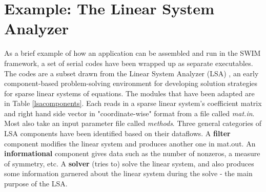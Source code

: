 \section{Example: The Linear System Analyzer}
\label{sec:lsa}

% 
% 
% 
% 
% 
% 
% 
% 

As a brief example of how an application can be assembled and run in the
SWIM framework, a set of serial codes have been wrapped up as separate
executables. The codes are a subset drawn from the Linear System Analyzer
(LSA) \cite{lsa_book},  an early component-based problem-solving environment for
developing solution strategies for sparse linear systems of equations. The
modules that have been adapted are in Table \ref{lsacomponents}.
Each reads in a sparse linear
system's coefficient matrix and right hand side vector in "coordinate-wise"
format from a file called {\em mat.in}.  Most also take an input parameter file
called {\em methods}. Three general categories of LSA components have been
identified based on their dataflows.
A {\bf filter} component modifies the linear system and produces
another one in mat.out.  An {\bf informational} component gives data such as the
number of nonzeros, a measure of symmetry, etc. A {\bf solver} (tries to) solve
the linear system, and also produces some information garnered about the linear
system during the solve - the main purpose of the LSA.

